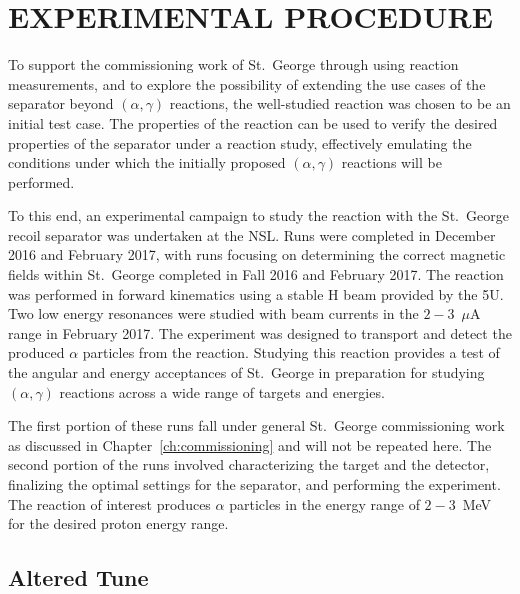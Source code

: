 
\chapter{EXPERIMENTAL PROCEDURE}
\label{ch:experimental-procedure}


To support the commissioning work of St.\ George through using reaction
measurements, and to explore the possibility of extending the use cases
of the separator beyond $(\alpha,\gamma)$ reactions, the well-studied
\alpa{} reaction was chosen to be an initial test case. The properties
of the reaction can be used to verify the desired properties of the
separator under a reaction study, effectively emulating the conditions
under which the initially proposed $(\alpha,\gamma)$ reactions will be
performed.

To this end, an experimental campaign to study the \alpa{} reaction with
the St.\ George recoil separator was undertaken at the NSL. Runs were
completed in December 2016 and February 2017, with runs focusing on
determining the correct magnetic fields within St.\ George completed in
Fall 2016 and February 2017. The reaction was performed in forward
kinematics using a stable H beam provided by the 5U. Two low energy
resonances were studied with beam currents in the $2-3$~$\mu$A range in
February 2017. The experiment was designed to transport and detect the
produced $\alpha$ particles from the reaction. Studying this reaction
provides a test of the angular and energy acceptances of St.\ George in
preparation for studying $(\alpha,\gamma)$ reactions across a wide range
of targets and energies.

The first portion of these runs fall under general St.\ George
commissioning work as discussed in Chapter~\ref{ch:commissioning} and
will not be repeated here. The second portion of the runs involved
characterizing the target and the detector, finalizing the optimal
settings for the separator, and performing the experiment. The reaction
of interest produces $\alpha$ particles in the energy range of $2-3$~MeV
for the desired proton energy range.

\section{Altered Tune}

